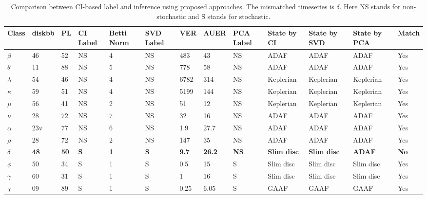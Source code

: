\documentclass[journal]{IEEEtran}
\begin{document}
	\begin{table}[t]
		\caption{Comparison between CI-based label and inference using proposed approaches. The mismatched timeseries is $\delta$. Here NS stands for non-stochastic and S stands for stochastic.}
		\begin{center}
			\begin{tabular}{|p{0.5cm}|p{0.5cm}|p{0.5cm}|p{0.75cm}|p{0.75cm}|p{0.75cm}|p{0.75cm}|p{1cm}|p{0.5cm}|p{1.25cm}|p{1.25cm}|p{1.25cm}|p{0.75cm}|}
				\hline
				Class &  diskbb & PL & CI \newline Label & Betti Norm & SVD \newline Label & VER & AUER & PCA \newline Label  &  State by CI & State by SVD  & State by PCA  &Match \\
				\hline
				$\beta$ & 46 & 52 & NS & 4 & NS & 483 & 43 & NS & ADAF & ADAF & ADAF & Yes\\
			\hline
				$\theta$ & 11 & 88 & NS &  5 & NS & 778 & 58 & NS  &  ADAF & ADAF & ADAF & Yes \\
				\hline
			$\lambda$ & 54& 46 & NS & 4 & NS & 6782 & 314 & NS & Keplerian & Keplerian & Keplerian & Yes \\
			\hline
				$\kappa$ &59 & 51& NS & 4 & NS & 5199 & 144 & NS & Keplerian & Keplerian & Keplerian &Yes \\
			\hline
		$\mu$ & 56 & 41& NS & 2 & NS & 51 & 12 & NS & Keplerian & Keplerian & Keplerian &Yes \\
		\hline
			$\nu$ &28 &72& NS & 7 & NS & 32 & 16 & NS & ADAF & ADAF & ADAF & Yes \\
			\hline
$\alpha$  & 23v& 77 & NS & 6 & NS & 1.9 & 27.7 & NS & ADAF & ADAF & ADAF &Yes \\
\hline
$\rho$ & 28& 72& NS & 2 & NS & 147 & 35 & NS & ADAF & ADAF & ADAF & Yes \\
\hline
\textbf{$\delta$} & \textbf{48} & \textbf{50} & \textbf{S} & \textbf{1} & \textbf{S} & \textbf{9.7} & \textbf{26.2} & \textbf{NS} & \textbf{Slim disc} & \textbf{Slim disc} & \textbf{ADAF} & \textbf{No} \\
\hline
$\phi$ & 50 &34&S & 1 & S & 0.5 & 15 & S & Slim disc & Slim disc & Slim disc &Yes \\
\hline
$\gamma$ & 60&31 & S & 1 & S & 1 & 16 & S & Slim disc & Slim disc & Slim disc &Yes \\
\hline
$\chi$ & 09& 89 & S & 1 & S & 0.25 & 6.05 & S & GAAF & GAAF & GAAF &Yes \\
\hline

\end{tabular}
\end{center}
\end{table}
\end{document}
